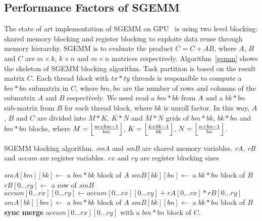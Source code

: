 \subsection{Performance Factors of SGEMM}
\label{sec:sgemm}
The state of art implementation of SGEMM on GPU~\cite{magma,nervana_sgemm_wiki,lai,tan} is using two level blocking:
shared memory blocking and register blocking to exploite data reuse through memory hierarchy.
SGEMM is to evaluate the product $C = C + AB$, where $A$, $B$ and $C$ are $m\times k$, $k\times n$ and $m\times n$
matrices respectively. 
Algorithm~\ref{gemm} shows the skeleton of SGEMM blocking algorithm. Task partition is based on the result matrix $C$. 
Each thread block with $tx*ty$ threads is responsible to compute a $bm*bn$ submatrix in $C$, where $bm, bn$ are the 
number of rows and columns of the submatrix $A$ and $B$ respectively. We need read a $bm*bk$ from $A$ and a $bk*bn$ sub-matrix from 
$B$ for each thread block, where $bk$ is unroll factor. In this way, $A$, $B$ and $C$ are divided into $M*K$, $K*N$ and 
$M*N$ grids of $bm*bk$, $bk*bn$ and $bm*bn$ blocks, where $M=\Bigl\lfloor \frac{m+bm-1}{bm} \Bigr\rfloor$, 
$K=\Bigl\lfloor \frac{k+bk-1}{bk} \Bigr\rfloor$, $N=\Bigl\lfloor \frac{n+bn-1}{bn} \Bigr\rfloor$.

\begin{algorithm}
  \caption{SGEMM blocking algorithm. {\em smA} and {\em smB} are shared memory variables. {\em rA}, {\em rB} and {\em 
accum} are register variables. $rx$ and $ry$ are register blocking sizes}
  \label{gemm}
  \begin{algorithmic}[1]
	\State $smA[bm][bk] \gets$ a $bm * bk$ block of $A$
	\State $smB[bk][bn] \gets$ a $bk * bn$ block of $B$
	\Do
      \State {\color {black} {$rA[0...rx]\gets$ a column of $smA$}}
	\State $rB[0...ry]\gets$ a row of $smB$
	\State $accum[0...rx][0...ry]\gets accum[0...rx][0...ry]+rA[0...rx]*rB[0...ry]$
	\EndFor
	\State $smA[bk][bm]\gets$ a $bm*bk$ block of $A$
	\State $smB[bk][bn]\gets$ a $bk*bn$ block of $B$
	\State \textbf{sync}
	\State \textbf{merge} $accum[0...rx][0...ry]$ with a $bm*bn$ block of $C$.
  \end{algorithmic}
\end{algorithm}

